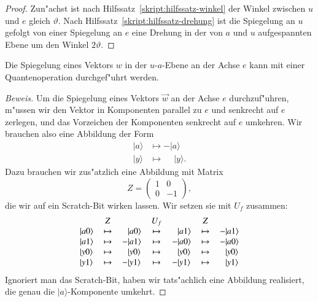 \begin{proof}
Zun"achst ist nach Hilfssatz~\ref{skript:hilfssatz-winkel}
der Winkel zwischen $u$ und $e$ gleich $\vartheta$.
Nach Hilfssatz~\ref{skript:hilfssatz-drehung} ist die Spiegelung
an $u$ gefolgt von einer Spiegelung an $e$ eine Drehung in der
von $a$ und $u$ aufgespannten Ebene um den Winkel $2\vartheta$.
\end{proof}

\begin{hilfssatz}
Die Spiegelung eines Vektors $w$ in der $u$-$a$-Ebene an
der Achse $e$ kann mit einer Quantenoperation durchgef"uhrt werden.
\label{skript:hilfssatz-spiegelung-e}
\end{hilfssatz}

\begin{proof}[Beweis]
Um die Spiegelung eines Vektors $\vec w$ an der Achse $e$ durchzuf"uhren,
m"ussen wir den Vektor in Komponenten parallel zu $e$ und senkrecht
auf $e$ zerlegen, und das Vorzeichen der Komponenten senkrecht auf
$e$ umkehren.
Wir brauchen also eine Abbildung der Form
\begin{align*}
|a\rangle&\mapsto -|a\rangle\\
|y\rangle&\mapsto \phantom{-}|y\rangle.
\end{align*}
Dazu brauchen wir zus"atzlich eine Abbildung mit Matrix
\[
Z=\begin{pmatrix}
1&0\\0&-1
\end{pmatrix},
\]
die wir auf ein Scratch-Bit wirken lassen.
Wir setzen sie mit $U_f$ zusammen:
\begin{equation}
\begin{tabular}{
>{$}l<{$}
>{$}c<{$}
>{$}l<{$}
>{$}c<{$}
>{$}l<{$}
>{$}c<{$}
>{$}l<{$}
}
          &Z      &                     &U_f    &                     &Z      &                     \\
|a0\rangle&\mapsto&\phantom{-}|a0\rangle&\mapsto&\phantom{-}|a1\rangle&\mapsto&         - |a1\rangle\\
|a1\rangle&\mapsto&         - |a1\rangle&\mapsto&         - |a0\rangle&\mapsto&         - |a0\rangle\\
|y0\rangle&\mapsto&\phantom{-}|y0\rangle&\mapsto&\phantom{-}|y0\rangle&\mapsto&\phantom{-}|y0\rangle\\
|y1\rangle&\mapsto&         - |y1\rangle&\mapsto&         - |y1\rangle&\mapsto&\phantom{-}|y1\rangle
\end{tabular}
\end{equation}
Ignoriert man das Scratch-Bit, haben wir tats"achlich eine Abbildung realisiert,
die genau die $|a\rangle$-Komponente umkehrt.
\end{proof}

